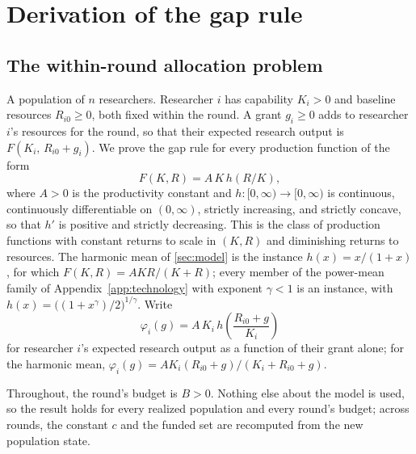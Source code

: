 \section{Derivation of the gap rule}\label{app:gap-rule}

\subsection*{The within-round allocation problem}

A population of $n$ researchers. Researcher $i$ has capability $K_i > 0$ and baseline resources $R_{i0} \geq 0$, both fixed within the round. A grant $g_i \geq 0$ adds to researcher $i$'s resources for the round, so that their expected research output is $F(K_i,\, R_{i0} + g_i)$. We prove the gap rule for every production function of the form
\[
F(K, R) = A\,K\,h(R/K),
\]
where $A > 0$ is the productivity constant and $h\colon [0, \infty) \to [0, \infty)$ is continuous, continuously differentiable on $(0, \infty)$, strictly increasing, and strictly concave, so that $h'$ is positive and strictly decreasing. This is the class of production functions with constant returns to scale in $(K, R)$ and diminishing returns to resources. The harmonic mean of \cref{sec:model} is the instance $h(x) = x/(1 + x)$, for which $F(K, R) = AKR/(K + R)$; every member of the power-mean family of Appendix~\ref{app:technology} with exponent $\gamma < 1$ is an instance, with $h(x) = \big((1 + x^{\gamma})/2\big)^{1/\gamma}$. Write
\[
\varphi_i(g) = A\,K_i\,h\!\left(\frac{R_{i0} + g}{K_i}\right)
\]
for researcher $i$'s expected research output as a function of their grant alone; for the harmonic mean, $\varphi_i(g) = A K_i (R_{i0} + g)/(K_i + R_{i0} + g)$.

Throughout, the round's budget is $B > 0$. Nothing else about the model is used, so the result holds for every realized population and every round's budget; across rounds, the constant $c$ and the funded set are recomputed from the new population state.

